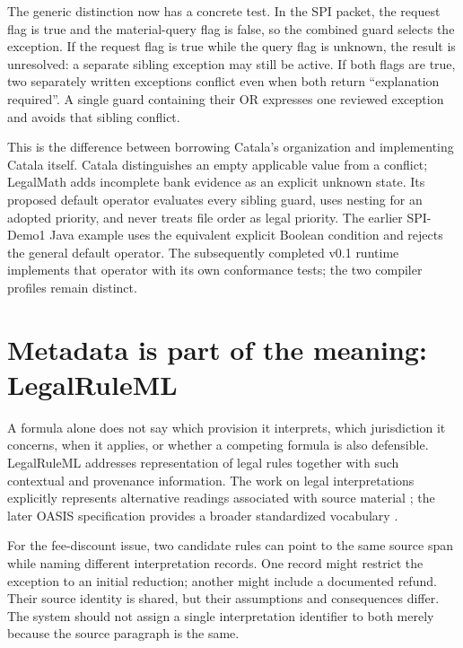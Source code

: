 \documentclass[12pt,a4paper,oneside,openany]{book}
\begin{document}
The generic distinction now has a concrete test. In the SPI packet, the request
flag is true and the material-query flag is false, so the combined guard selects
the exception. If the request flag is true while the query flag is unknown, the
result is unresolved: a separate sibling exception may still be active. If both
flags are true, two separately written exceptions conflict even when both return
``explanation required''. A single guard containing their OR expresses one
reviewed exception and avoids that sibling conflict.

This is the difference between borrowing Catala's organization and implementing
Catala itself. Catala distinguishes an empty applicable value from a conflict;
LegalMath adds incomplete bank evidence as an explicit unknown state. Its
proposed default operator evaluates every sibling guard, uses nesting for an
adopted priority, and never treats file order as legal priority. The earlier
SPI-Demo1 Java example uses the equivalent explicit Boolean condition and rejects
the general default operator. The subsequently completed v0.1 runtime implements
that operator with its own conformance tests; the two compiler profiles remain
distinct.

\section{Metadata is part of the meaning: LegalRuleML}
\label{merge:M04:04}

\label{sec:languages-legalruleml}
A formula alone does not say which provision it interprets, which jurisdiction
it concerns, when it applies, or whether a competing formula is also
defensible. LegalRuleML addresses representation of legal rules together with
such contextual and provenance information. The work on legal interpretations
explicitly represents alternative readings associated with source material
\citep[secs.~2--4]{legalinterpretations2014}; the later OASIS specification
provides a broader standardized vocabulary \citep{legalruleml2021}.

For the fee-discount issue, two candidate rules can point to the same source
span while naming different interpretation records. One record might restrict
the exception to an initial reduction; another might include a documented
refund. Their source identity is shared, but their assumptions and consequences
differ. The system should not assign a single interpretation identifier to
both merely because the source paragraph is the same.
\end{document}
